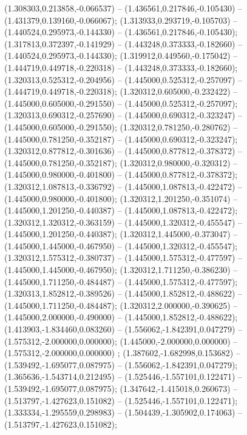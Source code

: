  (1.308303,0.213858,-0.066537) -- (1.436561,0.217846,-0.105430) -- (1.431379,0.139160,-0.066067);
 (1.313933,0.293719,-0.105703) -- (1.440524,0.295973,-0.144330) -- (1.436561,0.217846,-0.105430);
 (1.317813,0.372397,-0.141929) -- (1.443248,0.373333,-0.182660) -- (1.440524,0.295973,-0.144330);
 (1.319912,0.449560,-0.175042) -- (1.444719,0.449718,-0.220318) -- (1.443248,0.373333,-0.182660);
 (1.320313,0.525312,-0.204956) -- (1.445000,0.525312,-0.257097) -- (1.444719,0.449718,-0.220318);
 (1.320312,0.605000,-0.232422) -- (1.445000,0.605000,-0.291550) -- (1.445000,0.525312,-0.257097);
 (1.320313,0.690312,-0.257690) -- (1.445000,0.690312,-0.323247) -- (1.445000,0.605000,-0.291550);
 (1.320312,0.781250,-0.280762) -- (1.445000,0.781250,-0.352187) -- (1.445000,0.690312,-0.323247);
 (1.320312,0.877812,-0.301636) -- (1.445000,0.877812,-0.378372) -- (1.445000,0.781250,-0.352187);
 (1.320312,0.980000,-0.320312) -- (1.445000,0.980000,-0.401800) -- (1.445000,0.877812,-0.378372);
 (1.320312,1.087813,-0.336792) -- (1.445000,1.087813,-0.422472) -- (1.445000,0.980000,-0.401800);
 (1.320312,1.201250,-0.351074) -- (1.445000,1.201250,-0.440387) -- (1.445000,1.087813,-0.422472);
 (1.320312,1.320312,-0.363159) -- (1.445000,1.320312,-0.455547) -- (1.445000,1.201250,-0.440387);
 (1.320312,1.445000,-0.373047) -- (1.445000,1.445000,-0.467950) -- (1.445000,1.320312,-0.455547);
 (1.320312,1.575312,-0.380737) -- (1.445000,1.575312,-0.477597) -- (1.445000,1.445000,-0.467950);
 (1.320312,1.711250,-0.386230) -- (1.445000,1.711250,-0.484487) -- (1.445000,1.575312,-0.477597);
 (1.320313,1.852812,-0.389526) -- (1.445000,1.852812,-0.488622) -- (1.445000,1.711250,-0.484487);
 (1.320312,2.000000,-0.390625) -- (1.445000,2.000000,-0.490000) -- (1.445000,1.852812,-0.488622);
 (1.413903,-1.834460,0.083260) -- (1.556062,-1.842391,0.047279) -- (1.575312,-2.000000,0.000000);
 (1.445000,-2.000000,0.000000) -- (1.575312,-2.000000,0.000000) ;
 (1.387602,-1.682998,0.153682) -- (1.539492,-1.695077,0.087975) -- (1.556062,-1.842391,0.047279);
 (1.365636,-1.543714,0.212495) -- (1.525446,-1.557101,0.122471) -- (1.539492,-1.695077,0.087975);
 (1.347642,-1.415018,0.260673) -- (1.513797,-1.427623,0.151082) -- (1.525446,-1.557101,0.122471);
 (1.333334,-1.295559,0.298983) -- (1.504439,-1.305902,0.174063) -- (1.513797,-1.427623,0.151082);
